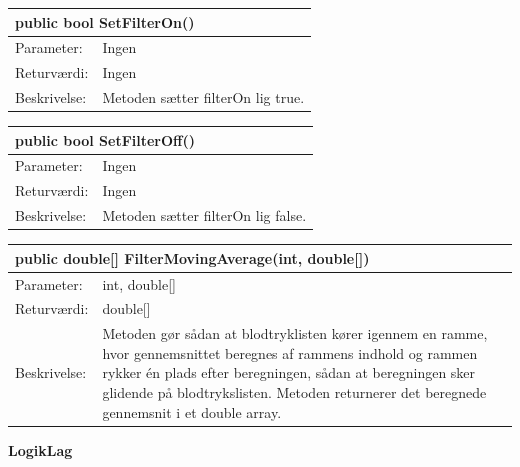 \begin{table}[H]
\label{tab:tabel2}
\begin{tabular}{| l | p{13cm} |}
   \hline
   \multicolumn{2}{|l|}{public bool SetFilterOn()} \\ \hline
   Parameter: & Ingen\\ \hline
   Returværdi: & Ingen\\ \hline
   Beskrivelse: & Metoden sætter filterOn lig true.\\ \hline
\end{tabular}
\end{table}
\begin{table}[H]
\label{tab:tabel2}
\begin{tabular}{| l | p{13cm} |}
   \hline
   \multicolumn{2}{|l|}{public bool SetFilterOff()} \\ \hline
   Parameter: & Ingen\\ \hline
   Returværdi: & Ingen\\ \hline
   Beskrivelse: & Metoden sætter filterOn lig false.\\ \hline
\end{tabular}
\end{table}
\begin{table}[H]
\label{tab:tabel2}
\begin{tabular}{| l | p{13cm} |}
   \hline
   \multicolumn{2}{|l|}{public double[] FilterMovingAverage(int, double[])} \\ \hline
   Parameter: & int, double[]\\ \hline
   Returværdi: & double[]\\ \hline
   Beskrivelse: & Metoden gør sådan at blodtryklisten kører igennem en ramme, hvor gennemsnittet beregnes af rammens indhold og rammen rykker én plads efter beregningen, sådan at beregningen sker glidende på blodtrykslisten. Metoden returnerer det beregnede gennemsnit i et double array. \\ \hline
\end{tabular}
\end{table}
\textbf{LogikLag}
